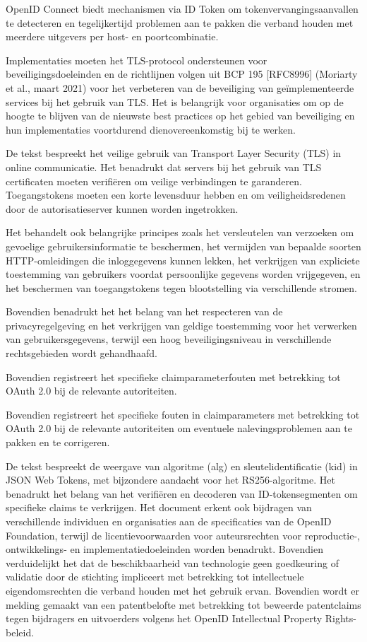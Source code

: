 OpenID Connect biedt mechanismen via ID Token om tokenvervangingsaanvallen te detecteren en tegelijkertijd problemen aan te pakken die verband houden met meerdere uitgevers per host- en poortcombinatie.

Implementaties moeten het TLS-protocol ondersteunen voor beveiligingsdoeleinden en de richtlijnen volgen uit BCP 195 [RFC8996] (Moriarty et al., maart 2021) voor het verbeteren van de beveiliging van geïmplementeerde services bij het gebruik van TLS.
Het is belangrijk voor organisaties om op de hoogte te blijven van de nieuwste best practices op het gebied van beveiliging en hun implementaties voortdurend dienovereenkomstig bij te werken.

De tekst bespreekt het veilige gebruik van Transport Layer Security (TLS) in online communicatie. Het benadrukt dat servers bij het gebruik van TLS certificaten moeten verifiëren om veilige verbindingen te garanderen. Toegangstokens moeten een korte levensduur hebben en om veiligheidsredenen door de autorisatieserver kunnen worden ingetrokken.

Het behandelt ook belangrijke principes zoals het versleutelen van verzoeken om gevoelige gebruikersinformatie te beschermen, het vermijden van bepaalde soorten HTTP-omleidingen die inloggegevens kunnen lekken, het verkrijgen van expliciete toestemming van gebruikers voordat persoonlijke gegevens worden vrijgegeven, en het beschermen van toegangstokens tegen blootstelling via verschillende stromen.

Bovendien benadrukt het het belang van het respecteren van de privacyregelgeving en het verkrijgen van geldige toestemming voor het verwerken van gebruikersgegevens, terwijl een hoog beveiligingsniveau in verschillende rechtsgebieden wordt gehandhaafd.

Bovendien registreert het specifieke claimparameterfouten met betrekking tot OAuth 2.0 bij de relevante autoriteiten.


Bovendien registreert het specifieke fouten in claimparameters met betrekking tot OAuth 2.0 bij de relevante autoriteiten om eventuele nalevingsproblemen aan te pakken en te corrigeren.

De tekst bespreekt de weergave van algoritme (alg) en sleutelidentificatie (kid) in JSON Web Tokens, met bijzondere aandacht voor het RS256-algoritme. Het benadrukt het belang van het verifiëren en decoderen van ID-tokensegmenten om specifieke claims te verkrijgen. Het document erkent ook bijdragen van verschillende individuen en organisaties aan de specificaties van de OpenID Foundation, terwijl de licentievoorwaarden voor auteursrechten voor reproductie-, ontwikkelings- en implementatiedoeleinden worden benadrukt. Bovendien verduidelijkt het dat de beschikbaarheid van technologie geen goedkeuring of validatie door de stichting impliceert met betrekking tot intellectuele eigendomsrechten die verband houden met het gebruik ervan. Bovendien wordt er melding gemaakt van een patentbelofte met betrekking tot beweerde patentclaims tegen bijdragers en uitvoerders volgens het OpenID Intellectual Property Rights-beleid.

